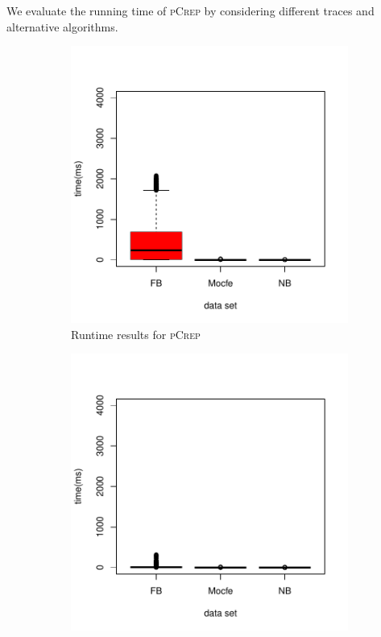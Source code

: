 \documentclass[a4paper,UKenglish,cleveref, autoref, thm-restate,authorcolumns]{lipics-v2019}
\newcommand{\adjDel}{\textsc{pCrep}}
\begin{document}
We evaluate the running time of \adjDel{} by considering different traces 
and alternative algorithms. 
	\begin{figure}[h]
		\centering
		\begin{minipage}{0.48\linewidth}
			\begin{subfigure}[b]{\linewidth}
				\includegraphics*[width=\linewidth]{plots/new_time_all_filtered_decompTree}
				\caption{Runtime results for \adjDel}
			\end{subfigure}		
		\end{minipage}
		\begin{minipage}{0.48\linewidth}
			\begin{subfigure}[b]{\linewidth}
				\includegraphics*[width=\linewidth]{plots/new_time_all_filtered_compDecomp}

\end{subfigure}
\end{minipage}
\end{figure}
\end{document}
